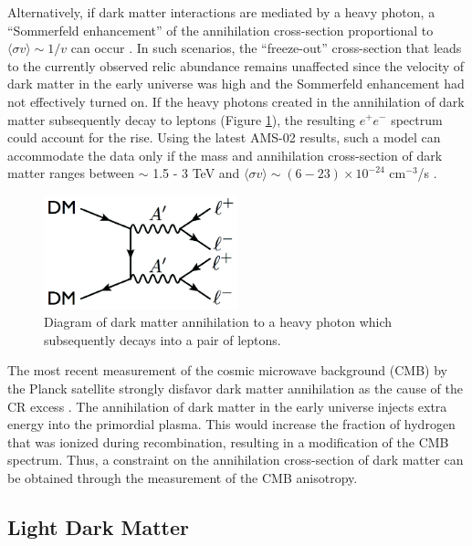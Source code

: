 Alternatively, if dark matter interactions are mediated by a heavy photon, a 
``Sommerfeld enhancement'' of the annihilation cross-section proportional to
$\langle \sigma v \rangle \sim 1/v$ can occur \cite{ArkaniHamed:2008qn}. 
In such scenarios, the
``freeze-out'' cross-section that leads to the currently observed relic
abundance remains unaffected since the velocity of dark matter in the early universe was
high and the Sommerfeld enhancement had not effectively turned on.  If the 
heavy photons created in the annihilation of dark matter subsequently decay to leptons
(Figure \ref{fig:dm_annihilation}), the resulting $e^+e^-$ spectrum could
account for the rise.  Using the latest AMS-02 results, such a model can 
accommodate the data only if the mass and annihilation 
cross-section of dark matter ranges between $\sim$ 1.5 - 3 TeV and 
$\langle \sigma v \rangle \sim (6-23) \times 10^{-24}$ cm$^{-3}$/s 
\cite{Cholis:2013psa}. 
\begin{figure}[t]
    \centering
    \includegraphics[width=0.5\textwidth]{images/dm_annihilation.png}
    \caption{Diagram of dark matter annihilation to a heavy photon which subsequently 
             decays into a pair of leptons.}
    \label{fig:dm_annihilation}
\end{figure}

The most recent measurement of the cosmic microwave background (CMB) by the
Planck satellite strongly disfavor dark matter annihilation as the cause of 
the CR excess \cite{Ade:2015xua}.  The annihilation of dark matter in the early
universe 
injects extra energy into the primordial plasma.  This would increase the 
fraction of hydrogen that was ionized during recombination, resulting in a 
modification of the CMB spectrum.  Thus, a constraint on the annihilation 
cross-section of dark matter can be obtained through the measurement of the
CMB anisotropy.  

\subsection{Light Dark Matter}

